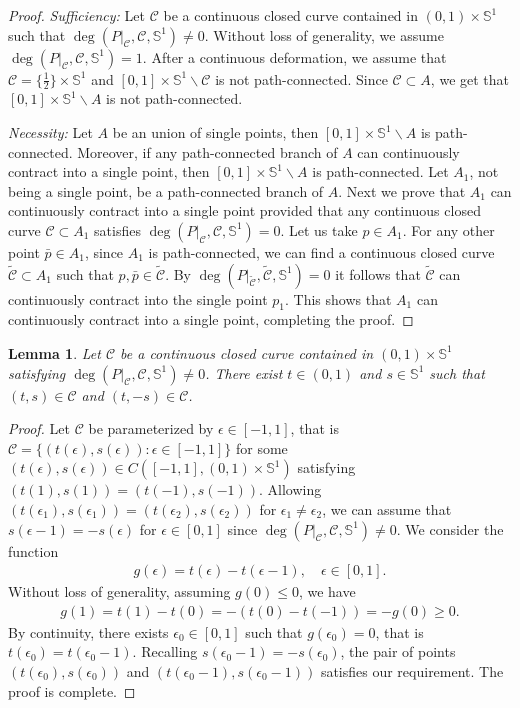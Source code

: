 \documentclass[10pt,a4paper]{article}
\newtheorem{lemma}[theorem]{Lemma}
\theoremstyle{definition} \theoremstyle{remark}
\numberwithin{equation}{section}
\newcommand{\s}{\mathbb{S}}
\newcommand{\ep}{\epsilon}
\begin{document}
\begin{proof}
	\emph{Sufficiency:} Let $\mathcal{C}$ be a continuous closed curve contained in $(0,1) \times \s^1$ such that $\deg(P|_{\mathcal{C}},\mathcal{C},\s^1) \neq 0$. Without loss of generality, we assume $\deg(P|_{\mathcal{C}},\mathcal{C},\s^1) =1$. After a continuous deformation, we assume that $\mathcal{C} = \{\frac12\} \times \s^1$ and $[0,1] \times \s^1 \backslash \mathcal{C}$ is not path-connected. Since $\mathcal{C} \subset A$, we get that $[0,1] \times \s^1 \backslash A$ is not path-connected.
	
	\vskip0.1in
	\emph{Necessity:}
	Let $A$ be an union of single points, then $[0,1] \times \s^1 \backslash A$ is path-connected. Moreover, if any path-connected branch of $A$ can continuously contract into a single point, then $[0,1] \times \s^1 \backslash A$ is path-connected. Let $A_1$, not being a single point, be a path-connected branch of $A$. Next we prove that $A_1$ can continuously contract into a single point provided that any continuous closed curve $\mathcal{C} \subset A_1$ satisfies $\deg(P|_{\mathcal{C}},\mathcal{C},\s^1) = 0$. Let us take $p \in A_1$. For any other point $\bar p \in A_1$, since $A_1$ is path-connected, we can find a continuous closed curve $\widetilde{\mathcal{C}} \subset A_1$ such that $p, \bar p \in \widetilde{\mathcal{C}}$. By $\deg(P|_{\widetilde{\mathcal{C}}},\widetilde{\mathcal{C}},\s^1) = 0$ it follows that $\widetilde{\mathcal{C}}$ can continuously contract into the single point $p_1$. This shows that $A_1$ can continuously contract into a single point, completing the proof.
\end{proof}

\begin{lemma} \label{lemtopo2}
	Let $\mathcal{C}$ be a continuous closed curve contained in $(0,1) \times \s^1$ satisfying $\deg(P|_{\mathcal{C}},\mathcal{C},\s^1) \neq 0$. There exist $t \in (0,1)$ and $s \in \s^1$ such that $(t,s) \in \mathcal{C}$ and $(t,-s) \in \mathcal{C}$.
\end{lemma}

\begin{proof}
	Let $\mathcal{C}$ be parameterized by $\ep \in [-1,1]$, that is $\mathcal{C} = \{(t(\ep),s(\ep)): \ep \in [-1,1]\}$ for some $(t(\ep),s(\ep)) \in C([-1,1],(0,1) \times \s^1)$ satisfying $(t(1),s(1)) = (t(-1),s(-1))$. Allowing $(t(\ep_1),s(\ep_1)) = (t(\ep_2),s(\ep_2))$ for $\ep_1 \neq \ep_2$, we can assume that $s(\ep-1) = -s(\ep)$ for $\ep \in [0,1]$ since $\deg(P|_{\mathcal{C}},\mathcal{C},\s^1) \neq 0$. We consider the function
	\begin{align*}
		g(\ep) = t(\ep) - t(\ep-1), \quad \ep \in [0,1].
	\end{align*}
	Without loss of generality, assuming $g(0) \le 0$, we have
	\begin{align*}
		g(1) = t(1) - t(0) = -(t(0) - t(-1)) = -g(0) \ge 0.
	\end{align*}
	By continuity, there exists $\ep_0 \in [0,1]$ such that $g(\ep_0) = 0$, that is $t(\ep_0) = t(\ep_0-1)$. Recalling $s(\ep_0-1) = -s(\ep_0)$, the pair of points $(t(\ep_0),s(\ep_0))$ and $(t(\ep_0-1),s(\ep_0-1))$ satisfies our requirement. The proof is complete.
\end{proof}
\end{document}
